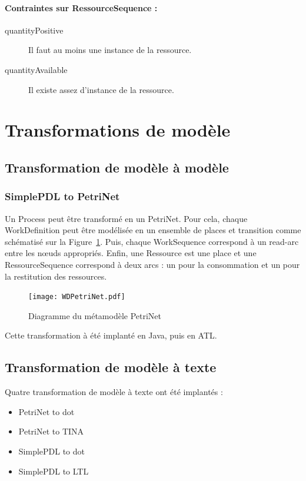 \documentclass[12pt]{article}
\begin{document}
\paragraph*{Contraintes sur RessourceSequence :}
\begin{description}
\item[quantityPositive] Il faut au moins une instance de la ressource.
\item[quantityAvailable] Il existe assez d'instance de la ressource.
\end{description}

\section{Transformations de modèle}
\subsection{Transformation de modèle à modèle}
\subsubsection{SimplePDL to PetriNet}
Un \textsf{Process} peut être transformé en un \textsf{PetriNet}. Pour cela, chaque \textsf{WorkDefinition} peut être modélisée en un ensemble de places et transition comme schématisé sur la Figure~\ref{fig:WDPetriNet}. Puis, chaque \textsf{WorkSequence} correspond à un read-arc entre les n\oe uds appropriés. Enfin, une \textsf{Ressource} est une place et une \textsf{RessourceSequence} correspond à deux arcs : un pour la consommation et un pour la restitution des ressources.

\begin{figure}[!h]
  \centering
  \texttt{[image: WDPetriNet.pdf]}
  \caption{Diagramme du métamodèle PetriNet}\label{fig:WDPetriNet} 
\end{figure}

Cette transformation à été implanté en Java, puis en ATL.

\subsection{Transformation de modèle à texte}
Quatre transformation de modèle à texte ont été implantés :
\begin{itemize}
\item PetriNet to dot
\item PetriNet to TINA
\item SimplePDL to dot
\item SimplePDL to LTL
\end{itemize}
\end{document}

